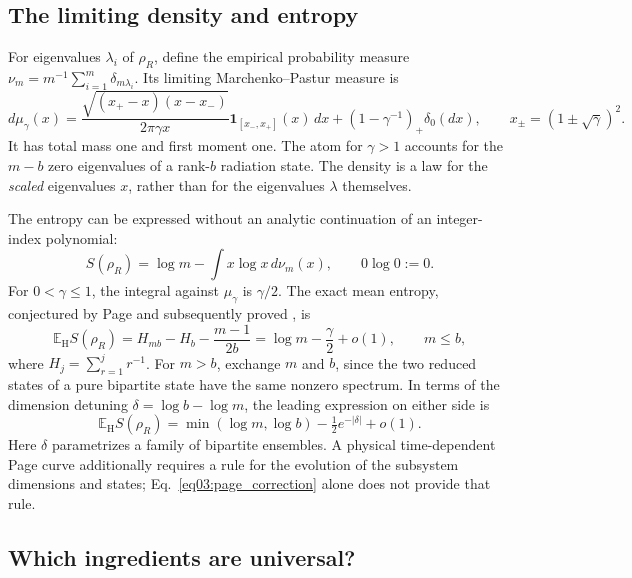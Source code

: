 \documentclass[11pt,letterpaper]{article}
\theoremstyle{plain}
\theoremstyle{definition}
\theoremstyle{remark}
\begin{document}
\subsection{The limiting density and entropy}
\label{subsec03:marchenko_pastur}

For eigenvalues $\lambda_i$ of $\rho_R$, define the empirical probability
measure $\nu_m=m^{-1}\sum_{i=1}^m\delta_{m\lambda_i}$.  Its limiting
Marchenko--Pastur measure is
\begin{equation}
\label{eq03:mp_density}
 d\mu_\gamma(x)=
 \frac{\sqrt{(x_+-x)(x-x_-)}}{2\pi\gamma x}
 \mathbf1_{[x_-,x_+]}(x)\,dx
 +(1-\gamma^{-1})_+\delta_0(dx),
 \qquad x_\pm=(1\pm\sqrt\gamma)^2.
\end{equation}
It has total mass one and first moment one.  The atom for $\gamma>1$
accounts for the $m-b$ zero eigenvalues of a rank-$b$ radiation state.
The density is a law for the \emph{scaled} eigenvalues $x$, rather than
for the eigenvalues $\lambda$ themselves.

The entropy can be expressed without an analytic continuation of an
integer-index polynomial:
\begin{equation}
\label{eq03:entropy_density}
 S(\rho_R)=\log m-\int x\log x\,d\nu_m(x),
 \qquad 0\log0:=0.
\end{equation}
For $0<\gamma\leq1$, the integral against $\mu_\gamma$ is $\gamma/2$.
The exact mean entropy, conjectured by Page and subsequently proved
\cite{page1993,sen1996}, is
\begin{equation}
\label{eq03:page_formula}
 \mathbb E_{\mathrm H}S(\rho_R)
 =H_{mb}-H_b-\frac{m-1}{2b}
 =\log m-\frac{\gamma}{2}+o(1),
 \qquad m\leq b,
\end{equation}
where $H_j=\sum_{r=1}^j r^{-1}$.  For $m>b$, exchange $m$ and $b$,
since the two reduced states of a pure bipartite state have the same
nonzero spectrum.  In terms of the dimension detuning
$\delta=\log b-\log m$, the leading expression on either side is
\begin{equation}
\label{eq03:page_correction}
 \mathbb E_{\mathrm H}S(\rho_R)
 =\min(\log m,\log b)-\tfrac12e^{-|\delta|}+o(1).
\end{equation}
Here $\delta$ parametrizes a family of bipartite ensembles.  A physical
time-dependent Page curve additionally requires a rule for the evolution
of the subsystem dimensions and states; Eq.~\eqref{eq03:page_correction}
alone does not provide that rule.

\subsection{Which ingredients are universal?}
\label{subsec03:free_probability}
\end{document}
